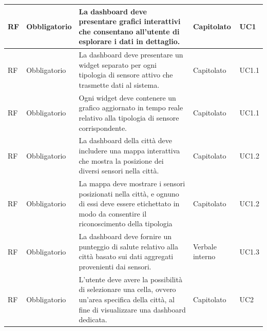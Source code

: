 \documentclass{article}
\begin{document}
\begin{longtable}{|C{1cm}|C{2cm}|>{\raggedright}m{5cm}|C{1.5cm}|C{2cm}|}
    \hline
     RF & Obbligatorio        & La dashboard deve presentare grafici interattivi che consentano all'utente di esplorare i dati in dettaglio.                                                                                                                       & Capitolato      & UC1               \\
    \hline
     RF & Obbligatorio        & La dashboard deve presentare un widget separato per ogni tipologia di sensore attivo che trasmette dati al sistema.                                                                                                                & Capitolato      & UC1.1               \\
    \hline
     RF & Obbligatorio        & Ogni widget deve contenere un grafico aggiornato in tempo reale relativo alla tipologia di sensore corrispondente.                                                                                                                 & Capitolato      & UC1.1               \\
    \hline
     RF & Obbligatorio        & La dashboard della città deve includere una mappa interattiva che mostra la posizione dei diversi sensori nella città.                                                                                                             & Capitolato      & UC1.2                   \\
    \hline
     RF & Obbligatorio        & La mappa deve mostrare i sensori posizionati nella città, e ognuno di essi deve essere etichettato in modo da consentire il riconoscimento della tipologia                                                                         & Capitolato      & UC1.2               \\
    \hline
     RF & Obbligatorio        & La dashboard deve fornire un punteggio di salute relativo alla città basato sui dati aggregati provenienti dai sensori.                                                                                                            & Verbale interno & UC1.3                    \\
    \hline
    \hline
     RF & Obbligatorio        & L'utente deve avere la possibilità di selezionare una cella, ovvero un'area specifica della città, al fine di visualizzare una dashboard dedicata.& Capitolato      & UC2              \\

\end{longtable}
\end{document}
